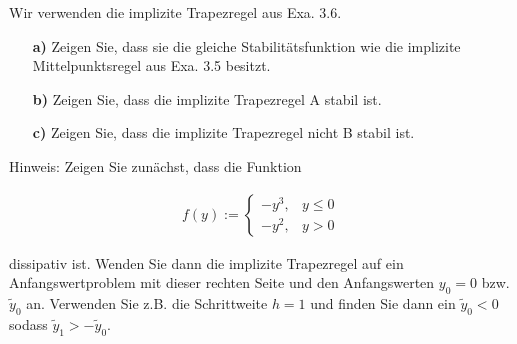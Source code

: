 \begin{exercise}
  Wir verwenden die implizite Trapezregel aus Exa. 3.6.

  \begin{itemize}
    \item[\textbf{a)}] Zeigen Sie, dass sie die gleiche Stabilitätsfunktion wie
    die implizite Mittelpunktsregel aus Exa. 3.5 besitzt.
    \item[\textbf{b)}] Zeigen Sie, dass die implizite Trapezregel A stabil ist.
    \item[\textbf{c)}] Zeigen Sie, dass die implizite Trapezregel nicht B stabil ist.
  \end{itemize}
  Hinweis: Zeigen Sie zunächst, dass die Funktion

  \begin{align}
    f(y) := \begin{cases}
      -y^3, & y \leq 0 \\
      -y^2, & y > 0
  \end{cases}
  \end{align}

  dissipativ ist. Wenden Sie dann die implizite Trapezregel auf ein Anfangswertproblem
  mit dieser rechten Seite und den Anfangswerten $y_0 = 0$ bzw. $\tilde{y}_0$ an.
  Verwenden Sie z.B. die Schrittweite $h=1$ und finden Sie dann ein $\tilde{y}_0 <0$ sodass
  $\tilde{y}_1 > - \tilde{y}_0$.
\end{exercise}

